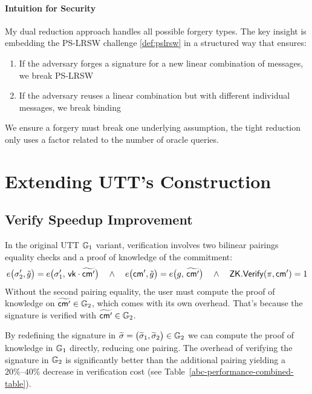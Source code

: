 \paragraph{Intuition for Security}
My dual reduction approach handles all possible forgery types. The key insight is embedding the PS-LRSW challenge \ref{def:pslrsw} in a structured way that ensures:
\begin{enumerate}
    \item If the adversary forges a signature for a new linear combination of messages, we break PS-LRSW
    \item If the adversary reuses a linear combination but with different individual messages, we break binding
\end{enumerate}
We ensure a forgery must break one underlying assumption, the tight reduction only uses a factor related to the number of oracle queries. 








\section{Extending UTT's Construction}\label{chap2:extending_utt_construction}



\subsection{Verify Speedup Improvement}\label{subsec:g2_verify_speedup}

In the original UTT $\mathbb{G}_1$ variant, verification involves two bilinear pairings equality checks and a proof of knowledge of the commitment:
$$
e\bigl(\sigma_{2}',\tilde g\bigr)
= e\bigl(\sigma_{1}',\,\mathsf{vk}\cdot\widetilde{\mathsf{cm}'}\bigr) \quad \wedge 
\quad
e\bigl(\mathsf{cm}',\tilde g\bigr)
= e\bigl(g,\,\widetilde{\mathsf{cm}'}\bigr)
\quad \wedge \quad \mathsf{ZK.Verify}(\pi,\mathsf{cm}')=1
$$
Without the second pairing equality, the user must compute the proof of knowledge on $\widetilde{\mathsf{cm}'} \in \mathbb{G}_2$, which comes with its own overhead. That's because the signature is verified with $\widetilde{\mathsf{cm}'} \in \mathbb{G}_2$.

By redefining the signature in $\widetilde\sigma = \bigl(\widetilde\sigma_1,\widetilde\sigma_2\bigr)\in\mathbb{G}_2$ we can compute the proof of knowledge in $\mathbb{G}_1$ directly, reducing one pairing. The overhead of verifying the signature in $\mathbb{G}_2$ is significantly better than the additional pairing yielding a $20\%\text{--}40\%$ decrease in verification cost (see Table~\ref{abc-performance-combined-table}).

